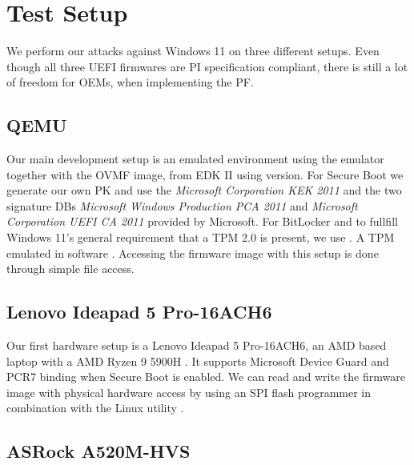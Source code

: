 
\chapter{Test Setup}
\label{sec:test-setup}

We perform our attacks against Windows 11 on three different setups.
Even though all three \ac{UEFI} firmwares are \ac{PI} specification compliant, there is still a lot of freedom for \acp{OEM}, when implementing the \ac{PF}.

\section{\acs{QEMU}}
\label{sec:test-setup:qemu}

Our main development setup is an emulated environment using the emulator  \cite{qemu} together with the \ac{OVMF} image, from \ac{EDK} II using version.
For Secure Boot we generate our own \ac{PK} and use the \emph{Microsoft Corporation \acs{KEK}  2011} and the two signature \acp{DB} \emph{Microsoft Windows Production PCA 2011} and \emph{Microsoft Corporation UEFI CA 2011} provided by Microsoft.
For BitLocker and to fullfill Windows 11's general requirement that a \ac{TPM} 2.0 is present, we use .
A \ac{TPM} emulated in software \cite{swtpm}.
Accessing the firmware image with this setup is done through simple file access.

\section{Lenovo Ideapad 5 Pro-16ACH6}
\label{sec:test-setup:lenovo}

Our first hardware setup is a Lenovo Ideapad 5 Pro-16ACH6, an \ac{AMD} based laptop with a \ac{AMD} Ryzen 9 5900H \cite{lenovo-ideapad}.
It supports Microsoft Device Guard and \ac{PCR}7 binding when Secure Boot is enabled.
We can read and write the firmware image with physical hardware access by using an \ac{SPI} flash programmer in combination with the Linux utility .

\section{ASRock A520M-HVS}
\label{sec:test-setup:asrock}

